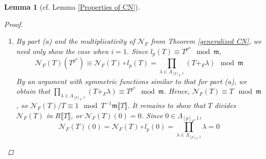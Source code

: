 \documentclass[12pt]{article}
\newtheorem{lemma}[theorem]{Lemma}
\theoremstyle{definition}
\newcommand{\PS}[1]{\llbracket #1 \rrbracket}
\def\CN{\mathscr{N}}
\def\m{\mathfrak{m}}
\begin{document}
\begin{lemma} [{{cf. Lemma \ref{Properties of CN}}}]
\begin{proof}
\begin{enumerate}
                \begin{equation*}
                    h \circ l_p(T) \equiv h(T^{p^n}) \mod{\m^j}
                \end{equation*}
                Since $h \circ l_p \in \m^j\PS{T}$, we must have $h \in \m^j\PS{T}$. 
                \item [(b)] By part (a) and the multiplicativity of $\CN_F$ from Theorem \ref{generalized CN}, we need only show the case when $i = 1$. Since $l_p(T) \equiv T^{p^n} \mod{\m}$, 
                \begin{equation*}
                    \CN_F(T)(T^{p^n}) \equiv \CN_F(T) \circ l_p(T) = \prod_{\lambda \in \Lambda_{[p]_F,1}} (T +_F \lambda) \mod{\m}
                \end{equation*}
                By an argument with symmetric functions similar to that for part (a), we obtain that $\prod_{\lambda \in \Lambda_{[p]_F,1}} (T +_F \lambda) \equiv T^{p^n} \mod{\m}$. Hence, $\CN_F(T) \equiv T \mod{\m}$, so $\CN_F(T)/T \equiv 1 \mod{T^{-1}\m\PS{T}}$. It remains to show that $T$ divides $\CN_F(T)$ in $R\PS{T}$, or $\CN_F(T)(0) = 0$. Since $0 \in \Lambda_{[p]_F,1}$, 
                \begin{equation*}
                    \CN_F(T)(0) = \CN_F(T) \circ l_p (0) = \prod_{\lambda \in \Lambda_{[p]_F,1}}\lambda = 0 
                \end{equation*}
            \end{enumerate}
        \end{proof}
    \end{lemma}
\end{document}
